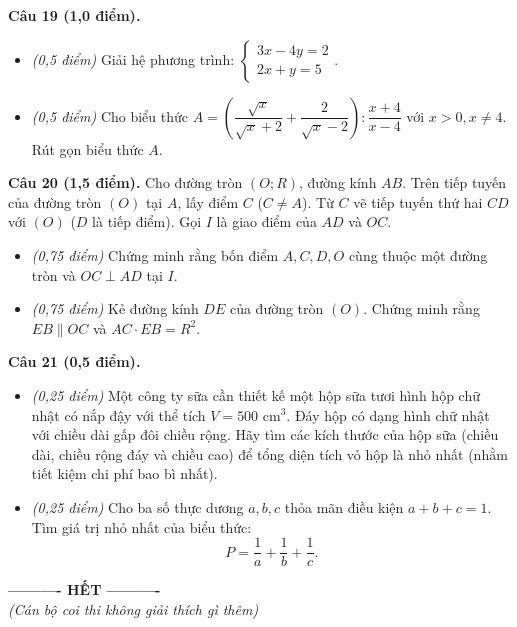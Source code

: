 \documentclass[11pt,a4paper]{article}
\begin{document}
\vspace{2mm}
\textbf{Câu 19 (1,0 điểm).}
\begin{itemize}
  \item[a)] \textit{(0,5 điểm)} Giải hệ phương trình: $\begin{cases} 3x - 4y = 2 \\ 2x + y = 5 \end{cases}$.
  \item[b)] \textit{(0,5 điểm)} Cho biểu thức $A = \left( \dfrac{\sqrt{x}}{\sqrt{x}+2} + \dfrac{2}{\sqrt{x}-2} \right) : \dfrac{x+4}{x-4}$ với $x > 0, x \ne 4$. Rút gọn biểu thức $A$.
\end{itemize}

\vspace{2mm}
\textbf{Câu 20 (1,5 điểm).} Cho đường tròn $(O; R)$, đường kính $AB$. Trên tiếp tuyến của đường tròn $(O)$ tại $A$, lấy điểm $C$ ($C \ne A$). Từ $C$ vẽ tiếp tuyến thứ hai $CD$ với $(O)$ ($D$ là tiếp điểm). Gọi $I$ là giao điểm của $AD$ và $OC$.
\begin{itemize}
  \item[a)] \textit{(0,75 điểm)} Chứng minh rằng bốn điểm $A, C, D, O$ cùng thuộc một đường tròn và $OC \perp AD$ tại $I$.
  \item[b)] \textit{(0,75 điểm)} Kẻ đường kính $DE$ của đường tròn $(O)$. Chứng minh rằng $EB \parallel OC$ và $AC \cdot EB = R^2$.
\end{itemize}

\vspace{2mm}
\textbf{Câu 21 (0,5 điểm).}
\begin{itemize}
  \item[a)] \textit{(0,25 điểm)} Một công ty sữa cần thiết kế một hộp sữa tươi hình hộp chữ nhật có nắp đậy với thể tích $V = 500\text{ cm}^3$. Đáy hộp có dạng hình chữ nhật với chiều dài gấp đôi chiều rộng. Hãy tìm các kích thước của hộp sữa (chiều dài, chiều rộng đáy và chiều cao) để tổng diện tích vỏ hộp là nhỏ nhất (nhằm tiết kiệm chi phí bao bì nhất).
  \item[b)] \textit{(0,25 điểm)} Cho ba số thực dương $a, b, c$ thỏa mãn điều kiện $a + b + c = 1$. Tìm giá trị nhỏ nhất của biểu thức:
  \[
  P = \dfrac{1}{a} + \dfrac{1}{b} + \dfrac{1}{c}.
  \]
\end{itemize}

\vspace{4mm}
\begin{center}
\textbf{---------- HẾT ----------}\\
\textit{(Cán bộ coi thi không giải thích gì thêm)}
\end{center}
\end{document}
